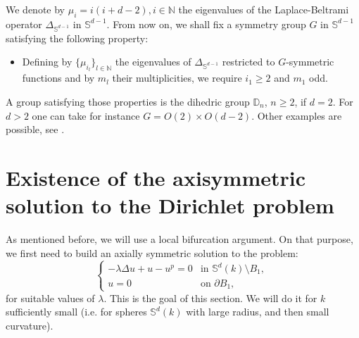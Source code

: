 \documentclass[reqno]{amsart}
\def\S{\mathbb S}
\def\Sk{\mathbb{S}^{d}(k)}
\numberwithin{equation}{section}
\newenvironment{key words}{\textbf{Keywords}\mbox{  }}{ }
\begin{document}
\medskip

We denote by $\mu_{i}=i(i+d-2),i\in\mathbb{N}$ the eigenvalues of the Laplace-Beltrami operator $\Delta_{\S^{d-1}}$ in $\mathbb{S}^{d-1}$. From now on, we shall fix a symmetry group $G$ in $\S^{d-1}$ satisfying the following property:
\begin{itemize}
  \item [(G)] Defining by $\{\mu_{i_{l}}\}_{l\in\mathbb{N}}$ the eigenvalues of $\Delta_{\mathbb{S}^{d-1}}$ restricted to $G$-symmetric functions and by $m_{l}$ their multiplicities, we require $i_{1}\geq2$ and $m_{1}$ odd.
\end{itemize}

A group satisfying those properties is the dihedric group $\mathbb{D}_n$, $n \geq 2$, if $d=2$. For $d>2$ one can take for instance $G=O(2) \times O(d-2)$. Other examples are possible, see \cite[Remark 2.2]{RRS20}.


\section{Existence of the axisymmetric solution to the Dirichlet problem}
\label{Section 3}
As mentioned before, we will use a local bifurcation argument. On that purpose, we first need to build an axially symmetric solution to the problem:
\begin{equation}\label{eq13}
  \begin{cases}
  -\lambda\Delta u+u-u^{p}=0 &\mbox{in $\mathbb{S}^{d}(k)\setminus B_{1}$, }\\
  u=0 &\mbox{on $\partial B_{1}$, }
   \end{cases}
\end{equation}
for suitable values of $\lambda$.
This is the goal of this section. We will do it for $k$ sufficiently small (i.e. for spheres $\Sk$ with large radius, and then small curvature).

\medskip
\end{document}
